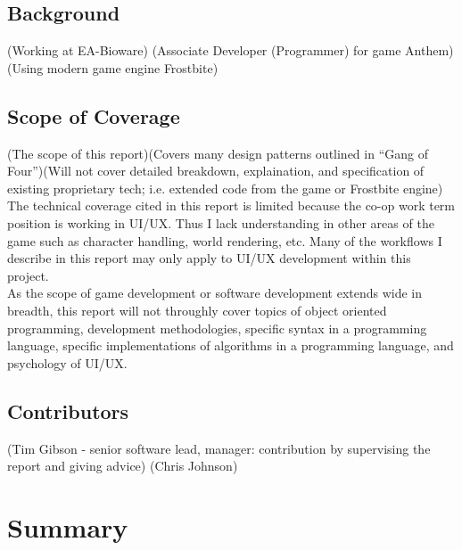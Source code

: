 \documentclass[10pt,letterpaper]{article}
\newcommand{\bs}{\bigskip}
\begin{document}
\subsection*{Background}

(Working at EA-Bioware)
(Associate Developer (Programmer) for game Anthem)
(Using modern game engine Frostbite)

\subsection*{Scope of Coverage}

(The scope of this report)(Covers many design patterns outlined in ``Gang of Four'')(Will not cover detailed breakdown, explaination, and specification of existing proprietary tech; i.e. extended code from the game or Frostbite engine)\bs
\\
The technical coverage cited in this report is limited because the co-op work term position is working in UI/UX. Thus I lack understanding in other areas of the game such as character handling, world rendering, etc. Many of the workflows I describe in this report may only apply to UI/UX development within this project.\bs
\\
As the scope of game development or software development extends wide in breadth, this report will not throughly cover topics of object oriented programming, development methodologies, specific syntax in a programming language, specific implementations of algorithms in a programming language, and psychology of UI/UX.

\subsection*{Contributors}

(Tim Gibson - senior software lead, manager: contribution by supervising the report and giving advice) 
(Chris Johnson)

\newpage

\section*{Summary}
\newpage

\listoffigures
{}
\listoftables
{}
\newpage
\end{document}
